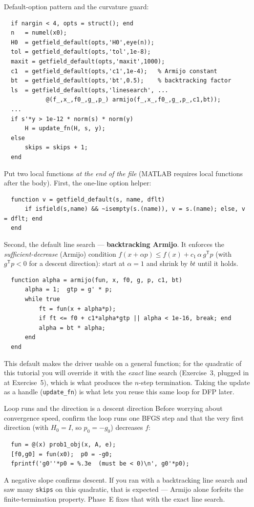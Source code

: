 \documentclass[11pt,letterpaper]{article}
\newcommand{\T}{^{\mathsf{T}}}
\begin{document}
\begin{hint}
Default-option pattern and the curvature guard:
\begin{verbatim}
  if nargin < 4, opts = struct(); end
  n   = numel(x0);
  H0  = getfield_default(opts,'H0',eye(n));
  tol = getfield_default(opts,'tol',1e-8);
  maxit = getfield_default(opts,'maxit',1000);
  c1  = getfield_default(opts,'c1',1e-4);   % Armijo constant
  bt  = getfield_default(opts,'bt',0.5);    % backtracking factor
  ls  = getfield_default(opts,'linesearch', ...
            @(f_,x_,f0_,g_,p_) armijo(f_,x_,f0_,g_,p_,c1,bt));
  ...
  if s'*y > 1e-12 * norm(s) * norm(y)
      H = update_fn(H, s, y);
  else
      skips = skips + 1;
  end
\end{verbatim}
Put two local functions \emph{at the end of the file} (MATLAB requires local
functions after the body). First, the one-line option helper:
\begin{verbatim}
  function v = getfield_default(s, name, dflt)
      if isfield(s,name) && ~isempty(s.(name)), v = s.(name); else, v = dflt; end
  end
\end{verbatim}
Second, the default line search --- \textbf{backtracking Armijo}. It enforces the
\emph{sufficient-decrease} (Armijo) condition $f(x+\alpha p)\le f(x)+c_1\,\alpha\,g\T p$
(with $g\T p<0$ for a descent direction): start at $\alpha=1$ and shrink by $bt$ until
it holds.
\begin{verbatim}
  function alpha = armijo(fun, x, f0, g, p, c1, bt)
      alpha = 1;  gtp = g' * p;
      while true
          ft = fun(x + alpha*p);
          if ft <= f0 + c1*alpha*gtp || alpha < 1e-16, break; end
          alpha = bt * alpha;
      end
  end
\end{verbatim}
This default makes the driver usable on a general function; for the quadratic of this
tutorial you will override it with the \emph{exact} line search (Exercise~3, plugged in
at Exercise~5), which is what produces the $n$-step termination. Taking the update as a
handle (\texttt{update\_fn}) is what lets you reuse this same loop for DFP later.
\end{hint}

\begin{checkpoint}{Loop runs and the direction is a descent direction}
Before worrying about convergence speed, confirm the loop runs one BFGS step and that
the very first direction (with $H_0=I$, so $p_0=-g_0$) decreases $f$:
\begin{verbatim}
  fun = @(x) prob1_obj(x, A, e);
  [f0,g0] = fun(x0);  p0 = -g0;
  fprintf('g0''*p0 = %.3e  (must be < 0)\n', g0'*p0);
\end{verbatim}
A negative slope confirms descent. If you ran with a backtracking line search and saw
many \texttt{skips} on this quadratic, that is expected --- Armijo alone forfeits the
finite-termination property. Phase~E fixes that with the exact line search.
\end{checkpoint}
\end{document}
